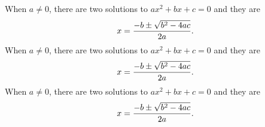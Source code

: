 When \(a \ne 0\), there are two solutions to \(ax^2 + bx + c = 0\) and they are
  \[x = {-b \pm \sqrt{b^2-4ac} \over 2a}.\]When \(a \ne 0\), there are two solutions to \(ax^2 + bx + c = 0\) and they are
  \[x = {-b \pm \sqrt{b^2-4ac} \over 2a}.\]When \(a \ne 0\), there are two solutions to \(ax^2 + bx + c = 0\) and they are
  \[x = {-b \pm \sqrt{b^2-4ac} \over 2a}.\]